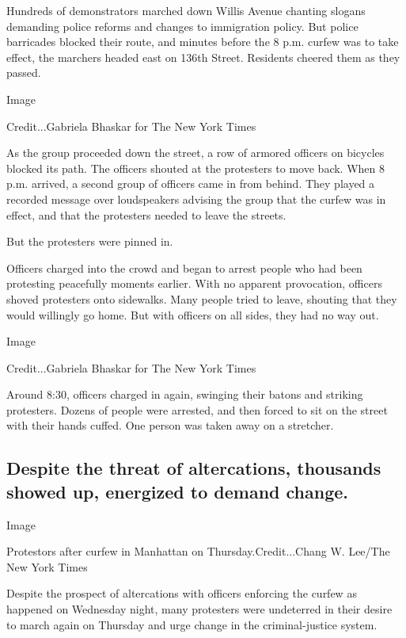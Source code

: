 Hundreds of demonstrators marched down Willis Avenue chanting slogans
demanding police reforms and changes to immigration policy. But police
barricades blocked their route, and minutes before the 8 p.m. curfew was
to take effect, the marchers headed east on 136th Street. Residents
cheered them as they passed.

Image

Credit...Gabriela Bhaskar for The New York Times

As the group proceeded down the street, a row of armored officers on
bicycles blocked its path. The officers shouted at the protesters to
move back. When 8 p.m. arrived, a second group of officers came in from
behind. They played a recorded message over loudspeakers advising the
group that the curfew was in effect, and that the protesters needed to
leave the streets.

But the protesters were pinned in.

Officers charged into the crowd and began to arrest people who had been
protesting peacefully moments earlier. With no apparent provocation,
officers shoved protesters onto sidewalks. Many people tried to leave,
shouting that they would willingly go home. But with officers on all
sides, they had no way out.

Image

Credit...Gabriela Bhaskar for The New York Times

Around 8:30, officers charged in again, swinging their batons and
striking protesters. Dozens of people were arrested, and then forced to
sit on the street with their hands cuffed. One person was taken away on
a stretcher.

\hypertarget{despite-the-threat-of-altercations-thousands-showed-up-energized-to-demand-change}{%
\subsection{Despite the threat of altercations, thousands showed up,
energized to demand
change.}\label{despite-the-threat-of-altercations-thousands-showed-up-energized-to-demand-change}}

Image

Protestors after curfew in Manhattan on Thursday.Credit...Chang W.
Lee/The New York Times

Despite the prospect of altercations with officers enforcing the curfew
as happened on Wednesday night, many protesters were undeterred in their
desire to march again on Thursday and urge change in the
criminal-justice system.

